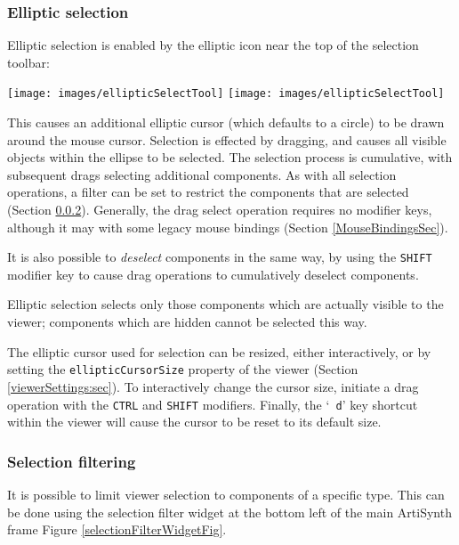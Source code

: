\documentclass{article}
\begin{document}
\subsubsection{Elliptic selection}
\label{ellipticSelection:sec}

Elliptic selection is enabled by the elliptic icon near the top of
the selection toolbar:

\vspace{\parskip}
\iflatexml
\texttt{[image: images/ellipticSelectTool]}
\else
\texttt{[image: images/ellipticSelectTool]}
\fi

This causes an additional elliptic cursor (which defaults to a circle)
to be drawn around the mouse cursor. Selection is effected by
dragging, and causes all visible objects within the ellipse to be
selected. The selection process is cumulative, with subsequent drags
selecting additional components. As with all selection operations, a
filter can be set to restrict the components that are selected
(Section \ref{selectionFiltersSec}). Generally, the drag select
operation requires no modifier keys, although it may with some legacy
mouse bindings (Section \ref{MouseBindingsSec}).

It is also possible to {\it deselect} components in the same way, by
using the {\tt SHIFT} modifier key to cause drag operations to
cumulatively deselect components.
	
\begin{sideblock}
Elliptic selection selects only those components which are actually
visible to the viewer; components which are hidden cannot be selected
this way.
\end{sideblock}

The elliptic cursor used for selection can be resized, either
interactively, or by setting the {\tt ellipticCursorSize} property of
the viewer (Section \ref{viewerSettings:sec}). To interactively change
the cursor size, initiate a drag operation with the {\tt CTRL} and
{\tt SHIFT} modifiers. Finally, the `{\tt
d}' key shortcut within the viewer will cause the cursor to be reset
to its default size.

\subsubsection{Selection filtering}
\label{selectionFiltersSec}

It is possible to limit viewer selection to components of a specific
type. This can be done using the selection filter widget at the bottom
left of the main ArtiSynth frame Figure
\ref{selectionFilterWidgetFig}.
\end{document}
